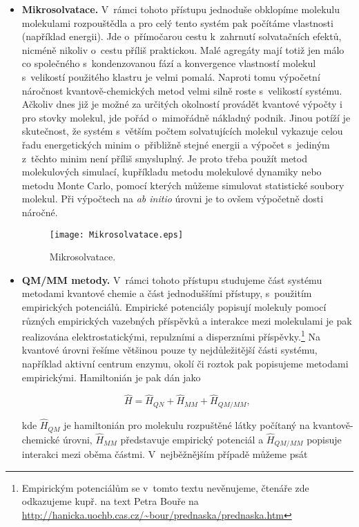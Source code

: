 \begin{itemize}

\item \textbf{Mikrosolvatace.} V~rámci tohoto přístupu jednoduše obklopíme molekulu molekulami rozpouštědla a pro celý tento systém pak počítáme vlastnosti (například energii). Jde o~přímočarou cestu k~zahrnutí solvatačních efektů, nicméně nikoliv o~cestu příliš praktickou. Malé agregáty mají totiž jen málo co společného s~kondenzovanou fází a konvergence vlastností molekul s~velikostí použitého klastru je velmi pomalá. Naproti tomu výpočetní náročnost kvantově-chemických metod velmi silně roste s~velikostí systému. Ačkoliv dnes již je možné za určitých okolností provádět kvantové výpočty i pro stovky molekul, jde pořád o~mimořádně nákladný podnik. Jinou potíží je skutečnost, že systém s~větším počtem solvatujících molekul vykazuje celou řadu energetických minim o~přibližně stejné energii a výpočet s~jediným z~těchto minim není příliš smysluplný. Je proto třeba použít metod molekulových simulací, kupříkladu metodu molekulové dynamiky nebo metodu Monte Carlo, pomocí kterých můžeme simulovat statistické soubory molekul. Při výpočtech na \textit{ab initio} úrovni je to ovšem výpočetně dosti náročné.

\begin{figure} [htb]
\centering
\texttt{[image: Mikrosolvatace.eps]}
\caption{Mikrosolvatace.}
\label{Mikrosolvatace}
\end{figure}

\item \textbf{QM/MM metody.} V~rámci tohoto přístupu studujeme část systému metodami kvantové chemie a část jednoduššími přístupy, s~použitím empirických potenciálů. Empirické potenciály popisují molekuly pomocí různých empirických vazebných příspěvků a interakce mezi molekulami je pak realizována elektrostatickými, repulzními a disperzními příspěvky.\footnote{Empirickým potenciálům se v~tomto textu nevěnujeme, čtenáře zde odkazujeme kupř. na text Petra Bouře na \url{http://hanicka.uochb.cas.cz/~bour/prednaska/prednaska.htm}}  Na kvantové úrovni řešíme většinou pouze ty nejdůležitější části systému, například aktivní centrum enzymu, okolí či roztok pak popisujeme metodami empirickými. Hamiltonián je pak dán jako


\begin{equation}
\hat{H} = \hat{H}_{QN} + \hat{H}_{MM} + \hat{H}_{QM/MM},
\label{rov:Sol-1}
\end{equation}

\noindent kde $\hat{H}_{QM}$ je hamiltonián pro molekulu rozpuštěné látky počítaný na kvantově-chemické úrovni, $\hat{H}_{MM}$ představuje empirický potenciál a $\hat{H}_{QM/MM}$ popisuje interakci mezi oběma částmi. V~nejběžnějším případě můžeme psát


\end{itemize}
